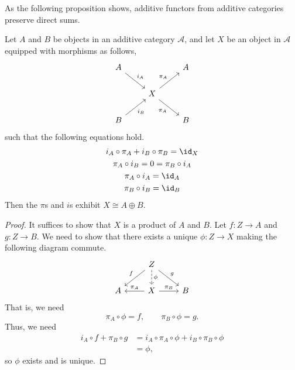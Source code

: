 \documentclass[main.tex]{subfiles}
\begin{document}
As the following proposition shows, additive functors from additive categories preserve direct sums.
\begin{lemma}
  \label{lemma:conditions_for_direct_sum}
  Let $A$ and $B$ be objects in an additive category $\mathcal{A}$, and let $X$ be an object in $\mathcal{A}$ equipped with morphisms as follows,
  \begin{equation*}
    \begin{tikzcd}
      A
      \arrow[dr, "i_{A}"]
      && A
      \\
      & X
      \arrow[ur, "\pi_{A}"]
      \arrow[dr, swap, "\pi_{A}"]
      \\
      B
      \arrow[ur, swap, "i_{B}"]
      && B
    \end{tikzcd}
  \end{equation*}
  such that the following equations hold.
  \begin{gather*}
    i_{A} \circ \pi_{A} + i_{B} \circ \pi_{B} = \id_{X} \\
    \pi_{A} \circ i_{B} = 0 = \pi_{B} \circ i_{A} \\
    \pi_{A} \circ i_{A} = \id_{A} \\
    \pi_{B} \circ i_{B} = \id_{B} \\
  \end{gather*}
  Then the $\pi$s and $i$s exhibit $X \cong A \oplus B$.
\end{lemma}
\begin{proof}
  It suffices to show that $X$ is a product of $A$ and $B$. Let $f\colon Z \to A$ and $g\colon Z \to B$. We need to show that there exists a unique $\phi\colon Z \to X$ making the following diagram commute.
  \begin{equation*}
    \begin{tikzcd}
      & Z
      \arrow[dl, swap, "f"]
      \arrow[d, dashed, "\phi"]
      \arrow[dr, "g"]
      \\
      A
      & X
      \arrow[l, swap, "\pi_{A}"]
      \arrow[r, "\pi_{B}"]
      & B
    \end{tikzcd}
  \end{equation*}
  That is, we need
  \begin{equation*}
    \pi_{A} \circ \phi = f,\qquad \pi_{B} \circ \phi = g.
  \end{equation*}
  Thus, we need
  \begin{align*}
    i_{A} \circ f + \pi_{B} \circ g  &= i_{A} \circ \pi_{A} \circ \phi + i_{B} \circ \pi_{B} \circ \phi \\
    &= \phi,
  \end{align*}
  so $\phi$ exists and is unique.
\end{proof}
\end{document}
